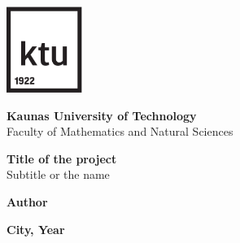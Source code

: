 
\begin{titlepage}
   \begin{center}
   	 

        \vspace*{0.3cm}
        \includegraphics[width=2.46cm]{images/ktu-ikona.pdf}
        \vspace{0.3cm}

       \textbf{Kaunas University of Technology}
       \\ Faculty of Mathematics and Natural Sciences
       \LARGE

       \vspace{3cm}
        \textbf{Title of the project}
        \large
        \\Subtitle or the name

       
       \vspace{1.5cm}
       \vspace{1.5cm}
       \normalsize\textbf{Author} \\
       \vspace{1.5cm}

       \vfill
            
       
       \textbf{City, Year}
   \end{center}
\end{titlepage}